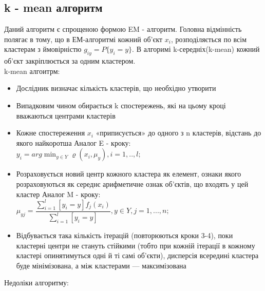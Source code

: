 \documentclass[a4paper,14pt,russian]{extreport}
\begin{document}
	\subsection{k - mean алгоритм}
	Даний алгоритм є спрощеною формою EM - алгоритм. Головна відмінність полягає в тому, що в  ЕМ-алгоритмі кожний об'єкт $x_i$, розподіляється по всім кластерам з ймовірністю $g_{iy} = P \{ y_i=y \}$. В алгоримі k-середніх(k-mean) кожний об'єкт закріплюється за одним кластером.\\ 
	
	 k-mean алгоитрм:

\begin{itemize}
\item	Дослідник визначає кількість кластерів, що необхідно утворити

\item Випадковим чином обирається k спостережень, які на цьому кроці вважаються центрами кластерів

\item Кожне спостереження  $x_i$  «приписується» до одного з n кластерів, відстань до якого найкоротша
Аналог E - кроку: \\
 		$y_i = arg \min_{y \in Y} \varrho (x_i,\mu_y), i=1,..,l;$

\item Розраховується новий центр кожного кластера як елемент, ознаки якого розраховуються як середнє арифметичне ознак об'єктів, що входять у цей кластер
Аналог  M - кроку: \\

 		$\mu_{yj} = \dfrac{\sum_{i=1}^{l} [y_i=y]f_j(x_i)}{\sum_{i=1}^{l}[y_i = y]}, y \in Y, j = 1,...,n;$

\item Відбувається така кількість ітерацій (повторюються кроки 3-4), поки кластерні центри не стануть стійкими (тобто при кожній ітерації в кожному кластері опинятимуться одні й ті самі об'єкти), дисперсія всередині кластера буде мінімізована, а між кластерами — максимізована
	
\end{itemize}	
	
\par Недоліки алгоритму: 
	
\end{document}
